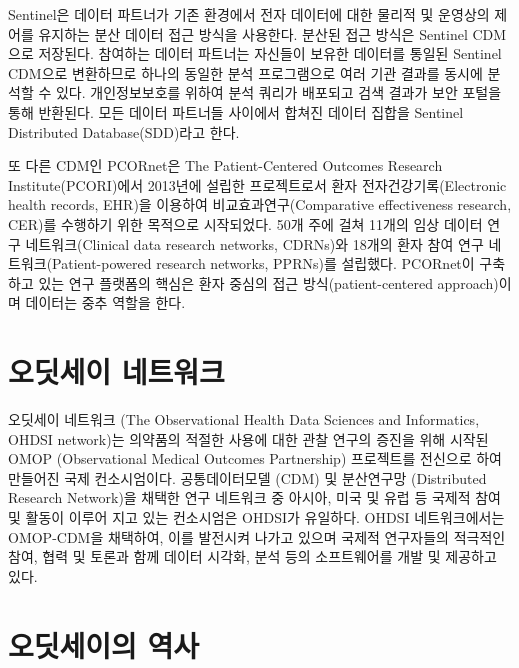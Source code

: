 \documentclass[]{book}
\begin{document}
Sentinel은 데이터 파트너가 기존 환경에서 전자 데이터에 대한 물리적 및 운영상의 제어를 유지하는 분산 데이터 접근 방식을 사용한다. 분산된 접근 방식은 Sentinel CDM으로 저장된다. 참여하는 데이터 파트너는 자신들이 보유한 데이터를 통일된 Sentinel CDM으로 변환하므로 하나의 동일한 분석 프로그램으로 여러 기관 결과를 동시에 분석할 수 있다. 개인정보보호를 위하여 분석 쿼리가 배포되고 검색 결과가 보안 포털을 통해 반환된다. 모든 데이터 파트너들 사이에서 합쳐진 데이터 집합을 Sentinel Distributed Database(SDD)라고 한다.

또 다른 CDM인 PCORnet은 The Patient-Centered Outcomes Research Institute(PCORI)에서 2013년에 설립한 프로젝트로서 환자 전자건강기록(Electronic health records, EHR)을 이용하여 비교효과연구(Comparative effectiveness research, CER)를 수행하기 위한 목적으로 시작되었다. 50개 주에 걸쳐 11개의 임상 데이터 연구 네트워크(Clinical data research networks, CDRNs)와 18개의 환자 참여 연구 네트워크(Patient-powered research networks, PPRNs)를 설립했다. PCORnet이 구축하고 있는 연구 플랫폼의 핵심은 환자 중심의 접근 방식(patient-centered approach)이며 데이터는 중추 역할을 한다.

\hypertarget{OHDSINetwork}{%
\section{오딧세이 네트워크}\label{OHDSINetwork}}

오딧세이 네트워크 (The Observational Health Data Sciences and Informatics, OHDSI network)는 의약품의 적절한 사용에 대한 관찰 연구의 증진을 위해 시작된 OMOP (Observational Medical Outcomes Partnership) 프로젝트를 전신으로 하여 만들어진 국제 컨소시엄이다. 공통데이터모델 (CDM) 및 분산연구망 (Distributed Research Network)을 채택한 연구 네트워크 중 아시아, 미국 및 유럽 등 국제적 참여 및 활동이 이루어 지고 있는 컨소시엄은 OHDSI가 유일하다. OHDSI 네트워크에서는 OMOP-CDM을 채택하여, 이를 발전시켜 나가고 있으며 국제적 연구자들의 적극적인 참여, 협력 및 토론과 함께 데이터 시각화, 분석 등의 소프트웨어를 개발 및 제공하고 있다.

\hypertarget{OHDSIHistory}{%
\section{오딧세이의 역사}\label{OHDSIHistory}}
\end{document}
